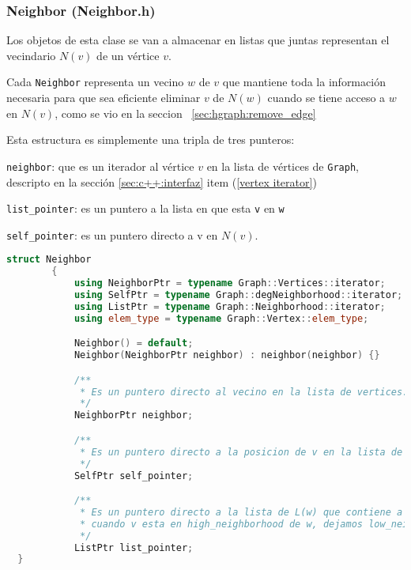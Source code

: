 \documentclass[%
    a4paper,%
    12pt,%
    twoside,%
    openright,%
    halfparskip,%
    cleardoubleempty,%
    bigheadings,%
    titlepage,%
    headsepline%
]{scrbook}
\makeatletter
\newcommand{\Code}[1]{\lstinline[basicstyle={\tt}]@#1@}
\makeatother
\begin{document}
\subsubsection{Neighbor (Neighbor.h)}
\label{sec:c++:estructura:Neighbor.h}

Los objetos de esta clase se van a almacenar en listas que juntas representan el vecindario $N(v)$ de un vértice $v$.

Cada \Code{Neighbor} representa un vecino $w$ de $v$ que mantiene toda la información necesaria para que sea eficiente eliminar $v$ de $N(w)$ cuando se tiene acceso a $w$ en $N(v)$, como se vio en la seccion ~\ref{sec:hgraph:remove_edge}

Esta estructura es simplemente una tripla de tres punteros:

\Code{neighbor}: que es un iterador al vértice $v$ en la lista de vértices de \Code{Graph}, descripto en la sección \ref{sec:c++:interfaz} item (\ref{vertex iterator})

\Code{list_pointer}: es un puntero a la lista en que esta \Code{v} en \Code{w}

\Code{self_pointer}: es un puntero directo a v en $N(v)$.


\begin{lstlisting}[language={C++},caption={Neighbor.h},gobble=2,float=ht,label={lst:c++:graph}]
     struct Neighbor
        {
            using NeighborPtr = typename Graph::Vertices::iterator;
            using SelfPtr = typename Graph::degNeighborhood::iterator;
            using ListPtr = typename Graph::Neighborhood::iterator;
            using elem_type = typename Graph::Vertex::elem_type;

            Neighbor() = default;
            Neighbor(NeighborPtr neighbor) : neighbor(neighbor) {}

            /**
             * Es un puntero directo al vecino en la lista de vertices.
             */
            NeighborPtr neighbor;

            /**
             * Es un puntero directo a la posicion de v en la lista de N(w) que lo contiene.
             */
            SelfPtr self_pointer;

            /**
             * Es un puntero directo a la lista de L(w) que contiene a v. (Solo tiene en cuenta los low_neighborhood;
             * cuando v esta en high_neighborhood de w, dejamos low_neighborhood.end())
             */
            ListPtr list_pointer;
  }
\end{lstlisting}
\end{document}
